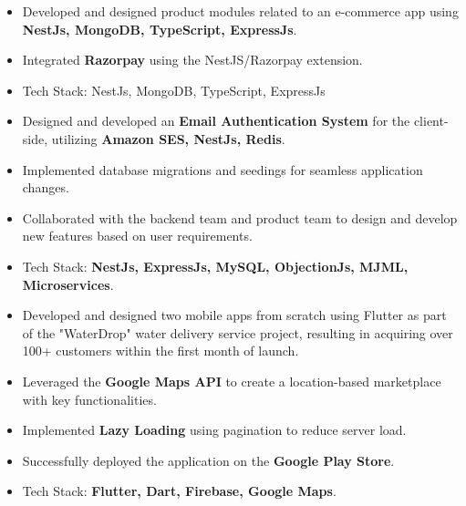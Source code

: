 \documentclass[10pt,a4paper,ragged2e,withhyper]{altacv}
\begin{document}
\begin{paracol}{2}


\begin{itemize}
\item Developed and designed product modules related to an e-commerce app using \textbf{\color{accent!90!black}NestJs, MongoDB, TypeScript, ExpressJs}.
\item Integrated \textbf{\color{accent!90!black}Razorpay} using the NestJS/Razorpay extension.

\item Tech Stack: NestJs, MongoDB, TypeScript, ExpressJs
\end{itemize}

\divider

\begin{itemize}
\item Designed and developed an \textbf{\color{accent!90!black}Email Authentication System} for the client-side, utilizing \textbf{\color{accent!90!black}Amazon SES, NestJs, Redis}.
\item Implemented database migrations and seedings for seamless application changes.
\item Collaborated with the backend team and product team to design and develop new features based on user requirements.
\item Tech Stack: \textbf{\color{accent!90!black}NestJs, ExpressJs, MySQL, ObjectionJs, MJML, Microservices}.
\end{itemize}

\divider

\begin{itemize}
\item Developed and designed two mobile apps from scratch using Flutter as part of the "WaterDrop" water delivery service project, resulting in acquiring over 100+ customers within the first month of launch.
\item Leveraged the \textbf{\color{accent!90!black}Google Maps API} to create a location-based marketplace with key functionalities.
\item Implemented \textbf{\color{accent!90!black}Lazy Loading} using pagination to reduce server load.
\item Successfully deployed the application on the \textbf{\color{accent!90!black}Google Play Store}.
\item Tech Stack: \textbf{\color{accent!90!black}Flutter, Dart, Firebase, Google Maps}.
\end{itemize}


\end{paracol}
\end{document}
